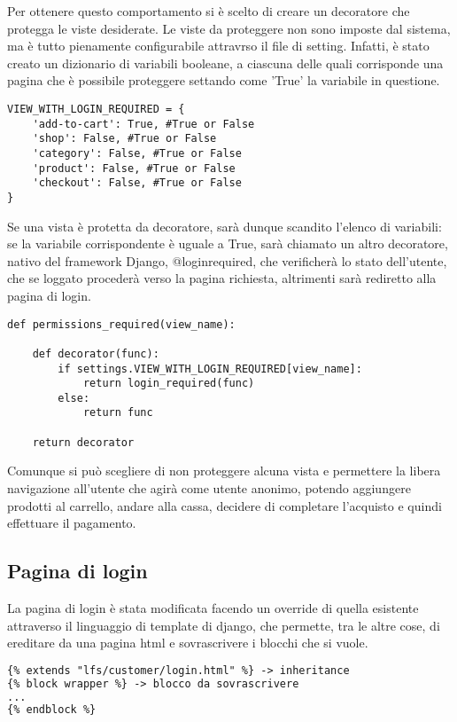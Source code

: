 Per ottenere questo comportamento si è scelto di creare un decoratore che protegga le viste desiderate.
Le viste da proteggere non sono imposte dal sistema, ma è tutto pienamente configurabile attravrso il file di setting. Infatti, è stato creato un dizionario di variabili booleane, a ciascuna delle quali corrisponde una pagina che è possibile proteggere settando come 'True' la variabile in questione.

\begin{lstlisting}[frame=single]
VIEW_WITH_LOGIN_REQUIRED = {
    'add-to-cart': True, #True or False
    'shop': False, #True or False
    'category': False, #True or False
    'product': False, #True or False
    'checkout': False, #True or False
}
\end{lstlisting}

Se una vista è protetta da decoratore, sarà dunque scandito l'elenco di variabili: se la variabile corrispondente è uguale a True, sarà chiamato un altro decoratore, nativo del framework Django, @login\textunderscore required, che verificherà lo stato dell'utente, che se loggato procederà verso la pagina richiesta, altrimenti sarà rediretto alla pagina di login.

\begin{lstlisting}[frame=single]
def permissions_required(view_name):
    
    def decorator(func):
        if settings.VIEW_WITH_LOGIN_REQUIRED[view_name]:
            return login_required(func)
        else:
            return func

    return decorator
\end{lstlisting}

Comunque si può scegliere di non proteggere alcuna vista e permettere la libera navigazione all'utente che agirà come utente anonimo, potendo aggiungere prodotti al carrello, andare alla cassa, decidere di completare l'acquisto e quindi effettuare il pagamento.

\subsection{Pagina di login}
La pagina di login è stata modificata facendo un override di quella esistente attraverso il linguaggio di template di django, che permette, tra le altre cose, di ereditare da una pagina html e sovrascrivere i blocchi che si vuole.

\begin{lstlisting}[language=html]
{% extends "lfs/customer/login.html" %} -> inheritance
{% block wrapper %} -> blocco da sovrascrivere
...
{% endblock %}
\end{lstlisting}

